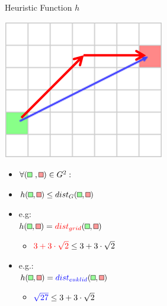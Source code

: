 \documentclass{presentation}
\newcommand{\rect}[1]{\tikz{\path[draw=black,fill=#1] (0,0) rectangle (2mm,2mm);}}
\newcommand{\grect}{\rect{white!60!green}}
\newcommand{\rrect}{\rect{white!60!red}}
\begin{document}
\begin{frame}{Heuristic Function $h$}
	\begin{minipage}{0.3\textwidth}
		\includegraphics[width=\textwidth]{figures/heuristic.png}
	\end{minipage}%
	\hfill%
	\begin{minipage}{0.6\textwidth}
		\begin{itemize}
		\item $\forall (\grect\ , \rrect)\in G^2:$
		\item $h(\grect, \rrect)\leq dist_{G}(\grect,\rrect)$
		\pause
		\item e.g:\\ $h(\grect, \rrect) = {\color{red}dist_{grid}}(\grect,\rrect)$
				\begin{itemize}
			\item ${\color{red}3+3\cdot\sqrt{2}}\leq 3+3\cdot\sqrt{2}$
		\end{itemize}
		\pause
		\item e.g.:\\ $h(\grect, \rrect) = {\color{blue}dist_{euklid}}(\grect,\rrect)$
		\begin{itemize}
			\item ${\color{blue}\sqrt{27}} \leq 3+3\cdot\sqrt{2}$
		\end{itemize}
		\end{itemize}
	\end{minipage}
\end{frame}
\end{document}
